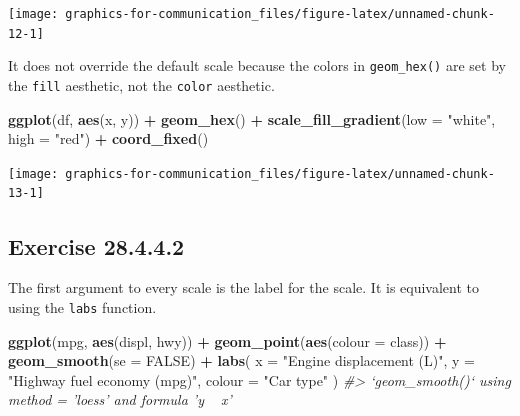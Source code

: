 \documentclass[]{book}
\newenvironment{Shaded}{\begin{snugshade}}{\end{snugshade}}
\newcommand{\CommentTok}[1]{\textcolor[rgb]{0.56,0.35,0.01}{\textit{#1}}}
\newcommand{\DataTypeTok}[1]{\textcolor[rgb]{0.13,0.29,0.53}{#1}}
\newcommand{\KeywordTok}[1]{\textcolor[rgb]{0.13,0.29,0.53}{\textbf{#1}}}
\newcommand{\NormalTok}[1]{#1}
\newcommand{\OperatorTok}[1]{\textcolor[rgb]{0.81,0.36,0.00}{\textbf{#1}}}
\newcommand{\OtherTok}[1]{\textcolor[rgb]{0.56,0.35,0.01}{#1}}
\newcommand{\StringTok}[1]{\textcolor[rgb]{0.31,0.60,0.02}{#1}}
\theoremstyle{plain}
\theoremstyle{remark}
\begin{document}
\begin{center}\texttt{[image: graphics-for-communication\_files/figure-latex/unnamed-chunk-12-1]} \end{center}

It does not override the default scale because the colors in \texttt{geom\_hex()} are set by the \texttt{fill} aesthetic, not the \texttt{color} aesthetic.

\begin{Shaded}
\begin{Highlighting}[]
\KeywordTok{ggplot}\NormalTok{(df, }\KeywordTok{aes}\NormalTok{(x, y)) }\OperatorTok{+}
\StringTok{  }\KeywordTok{geom_hex}\NormalTok{() }\OperatorTok{+}
\StringTok{  }\KeywordTok{scale_fill_gradient}\NormalTok{(}\DataTypeTok{low =} \StringTok{"white"}\NormalTok{, }\DataTypeTok{high =} \StringTok{"red"}\NormalTok{) }\OperatorTok{+}
\StringTok{  }\KeywordTok{coord_fixed}\NormalTok{()}
\end{Highlighting}
\end{Shaded}

\begin{center}\texttt{[image: graphics-for-communication\_files/figure-latex/unnamed-chunk-13-1]} \end{center}

\hypertarget{exercise-28.4.4.2}{%
\subsection*{\texorpdfstring{Exercise {28.4.4.2}}{Exercise 28.4.4.2}}\label{exercise-28.4.4.2}}

The first argument to every scale is the label for the scale.
It is equivalent to using the \texttt{labs} function.

\begin{Shaded}
\begin{Highlighting}[]
\KeywordTok{ggplot}\NormalTok{(mpg, }\KeywordTok{aes}\NormalTok{(displ, hwy)) }\OperatorTok{+}
\StringTok{  }\KeywordTok{geom_point}\NormalTok{(}\KeywordTok{aes}\NormalTok{(}\DataTypeTok{colour =}\NormalTok{ class)) }\OperatorTok{+}
\StringTok{  }\KeywordTok{geom_smooth}\NormalTok{(}\DataTypeTok{se =} \OtherTok{FALSE}\NormalTok{) }\OperatorTok{+}
\StringTok{  }\KeywordTok{labs}\NormalTok{(}
    \DataTypeTok{x =} \StringTok{"Engine displacement (L)"}\NormalTok{,}
    \DataTypeTok{y =} \StringTok{"Highway fuel economy (mpg)"}\NormalTok{,}
    \DataTypeTok{colour =} \StringTok{"Car type"}
\NormalTok{  )}
\CommentTok{#> `geom_smooth()` using method = 'loess' and formula 'y ~ x'}
\end{Highlighting}
\end{Shaded}
\end{document}
